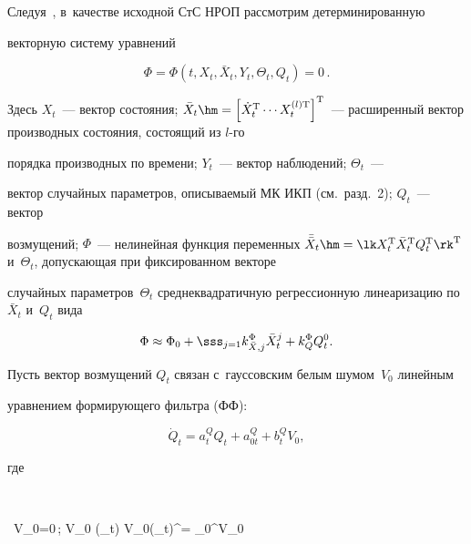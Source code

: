 Следуя~\cite{4-sin, 12-sin}, в~качестве исходной СтС НРОП рассмотрим детерминированную  

векторную систему уравнений

\begin{equation}

\Phi = \Phi \left( t, X_t, \bar X_t, Y_t, \Theta_t, Q_t\right) =0\,.

\label{e3.1-sin}

\end{equation}

Здесь $X_t$~--- вектор состояния; $\bar X_t\hm= \left[ \dot X_t^{\mathrm{T}} \cdots 

X_t^{(l)\mathrm{T}}\right]^{\mathrm{T}}$~--- расширенный вектор производных состояния, состоящий из $l$-го 

порядка производных по времени; $Y_t$~--- вектор наблюдений; $\Theta_t$~--- 

вектор случайных параметров, описываемый МК ИКП (см.\ разд.~2); $Q_t$~--- вектор 

возмущений; $\Phi$~--- нелинейная функция переменных  $\bar{\bar X}_t\hm = \lk X_t^{\mathrm{T}} 

\bar X_t^{\mathrm{T}} Q_t^{\mathrm{T}}\rk^{\mathrm{T}}$ и~$\Theta_t$, допускающая при фиксированном векторе 

случайных параметров~$\Theta_t$ среднеквадратичную регрессионную линеаризацию по~$\bar X_t$  и~$Q_t$ вида

 \begin{equation*}

 \Phi\approx \Phi_0 + \sss_{j=1} k_{\bar X,j}^\Phi \bar X_t^j + k_Q^\Phi Q_t^0.


 \end{equation*}

Пусть вектор возмущений $Q_t$ связан с~гауссовским белым шумом~$V_0$ линейным 

уравнением формирующего фильтра (ФФ):

\begin{equation}

\dot Q_t = a_t^Q Q_t +  a_{0t}^Q + b_t^Q V_0,\label{e3.3-sin}

\end{equation}

где 

$$

\, V_0=0\,;\enskip {} \lk V_0 (\Theta_t) V_0(\Theta_t)^{}\rk \hm= \nu_0^{V_0} 

